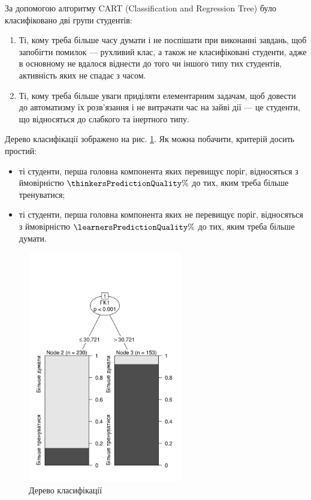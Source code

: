 За допомогою алгоритму CART (Classification and Regression Tree) було
класифіковано дві групи студентів:
\begin{enumerate}
  \item
    Ті, кому треба більше часу думати і не поспішати при виконанні завдань,
    щоб запобігти помилок --- рухливий клас, а також не класифіковані
    студенти, адже в основному не вдалося віднести до того чи іншого типу
    тих студентів, активність яких не спадає з часом.
  \item
    Ті, кому треба більше уваги приділяти елементарним задачам,
    щоб довести до автоматизму їх розв’язання і не витрачати час на
    зайві дії --- це студенти, що відносяться до слабкого та інертного типу.
\end{enumerate}
Дерево класифікації зображено на рис. \ref{fig:tree:simple}.
Як можна побачити, критерій досить простий:
\begin{itemize}
  \item
    ті студенти, перша головна компонента яких перевищує поріг,
    відносяться з ймовірністю $\thinkersPredictionQuality\%$ до тих,
    яким треба більше тренуватися;
  \item
    ті студенти, перша головна компонента яких не перевищує поріг,
    відносяться з ймовірністю $\learnersPredictionQuality\%$ до тих,
    яким треба більше думати.
\end{itemize}
\begin{figure}[h]
  \centering
    \includegraphics[width=0.6\textwidth]{images/tree}
  \caption{Дерево класифікації}
  \label{fig:tree:simple}
\end{figure}

